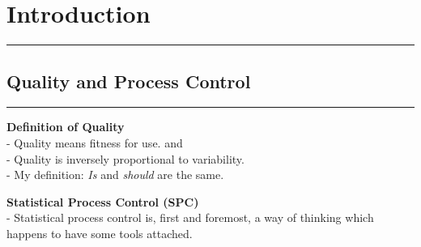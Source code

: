 \section{Introduction}
\noindent\rule[\linienAbstand]{\linewidth}{\linienDickeDick}

\subsection{Quality and Process Control}
\noindent\rule[\linienAbstand]{\linewidth}{\linienDicke}
\textbf{Definition of Quality}\\
- Quality means fitness for use. and\\
- Quality is inversely proportional to variability.\\
- My definition: \emph{Is} and \emph{should} are the same.


\textbf{Statistical Process Control (SPC)}\\
- Statistical process control is, first and foremost, a way of thinking which happens to have some tools attached.
